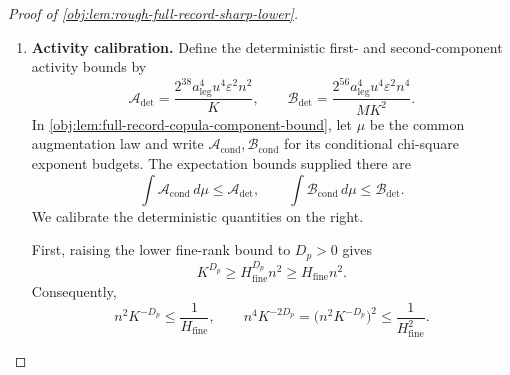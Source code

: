 \documentclass[11pt]{article}
\begin{document}
\begin{proof}[Proof of \cref{obj:lem:rough-full-record-sharp-lower}]
\begin{enumerate}
The rank conditions established above allow us to apply
\cref{obj:lem:copula-frame-legality}. Every null support law belongs to \(H_0(v)\), and every alternative support law satisfies
\[
P\in\mathcal M_v,
\qquad
2^{-17}K^{-S}\le d(P)<d_0.
\]
The upper rounding bound and \(S>0\) imply
\[
\begin{aligned}
c_vn^{-E_4(p)}
&\le k_vn^{-E_4(p)}\\
&=2^{-17}(2H_{\mathrm{fine}})^{-S}n^{-2S/D_p}\\
&=2^{-17}(2H_{\mathrm{fine}}n^{2/D_p})^{-S}\\
&\le2^{-17}K^{-S}\le d(P).
\end{aligned}
\]
This proves the required alternative placement for the copula pair.

\item \textbf{Activity calibration.}
Define the deterministic first- and second-component activity bounds by
\[
\mathcal A_{\mathrm{det}}=
\frac{2^{38}a_{\mathrm{leg}}^4u^4\varepsilon^2n^2}{K},
\qquad
\mathcal B_{\mathrm{det}}=
\frac{2^{56}a_{\mathrm{leg}}^4u^4\varepsilon^2n^4}{MK^2}.
\]
In \cref{obj:lem:full-record-copula-component-bound}, let \(\mu\) be the common augmentation law and write \(\mathcal A_{\mathrm{cond}},\mathcal B_{\mathrm{cond}}\) for its conditional chi-square exponent budgets. The expectation bounds supplied there are
\[
\int\mathcal A_{\mathrm{cond}}\,d\mu
\le\mathcal A_{\mathrm{det}},
\qquad
\int\mathcal B_{\mathrm{cond}}\,d\mu
\le\mathcal B_{\mathrm{det}}.
\]
We calibrate the deterministic quantities on the right.

First, raising the lower fine-rank bound to \(D_p>0\) gives
\[
K^{D_p}\ge H_{\mathrm{fine}}^{D_p}n^2
\ge H_{\mathrm{fine}}n^2.
\]
Consequently,
\[
n^2K^{-D_p}\le\frac1{H_{\mathrm{fine}}},
\qquad
n^4K^{-2D_p}
=\bigl(n^2K^{-D_p}\bigr)^2
\le\frac1{H_{\mathrm{fine}}^2}.
\]


\end{enumerate}
\end{proof}
\end{document}
